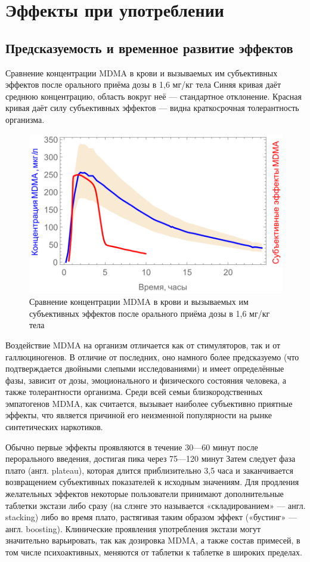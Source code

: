 \documentclass[a4paper,14pt,russian]{report}
\begin{document}
\section{Эффекты при употреблении}

\subsection{Предсказуемость и временное развитие эффектов}

Сравнение концентрации MDMA в крови и вызываемых им субъективных эффектов после орального приёма дозы в 1,6 мг/кг тела Синяя кривая даёт среднюю концентрацию, область вокруг неё — стандартное отклонение. Красная кривая даёт силу субъективных эффектов — видна краткосрочная толерантность организма.

\begin{figure}[!htb]
\centerline{\includegraphics{effects}}
\caption{Сравнение концентрации MDMA в крови и вызываемых им субъективных эффектов после орального приёма дозы в 1,6 мг/кг тела}
\end{figure}

Воздействие MDMA на организм отличается как от стимуляторов, так и от галлюциногенов. В отличие от последних, оно намного более предсказуемо (что подтверждается двойными слепыми исследованиями) и имеет определённые фазы, зависит от дозы, эмоционального и физического состояния человека, а также толерантности организма. Среди всей семьи близкородственных эмпатогенов MDMA, как считается, вызывает наиболее субъективно приятные эффекты, что является причиной его неизменной популярности на рынке синтетических наркотиков.

Обычно первые эффекты проявляются в течение 30—60 минут после перорального введения, достигая пика через 75—120 минут Затем следует фаза плато (англ. plateau), которая длится приблизительно 3,5 часа и заканчивается возвращением субъективных показателей к исходным значениям. Для продления желательных эффектов некоторые пользователи принимают дополнительные таблетки экстази либо сразу (на слэнге это называется «складированием» — англ. stacking) либо во время плато, растягивая таким образом эффект («бустинг» — англ. boosting). Клинические проявления употребления экстази могут значительно варьировать, так как дозировка MDMA, а также состав примесей, в том числе психоактивных, меняются от таблетки к таблетке в широких пределах.
\end{document}
